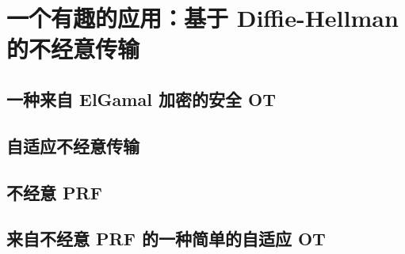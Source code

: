 \section{一个有趣的应用：基于 Diffie-Hellman 的不经意传输}

\subsection{一种来自 ElGamal 加密的安全 OT}

\subsection{自适应不经意传输}\label{subsec:11-7-2}

\subsection{不经意 PRF}\label{subsec:11-7-3}

\subsection{来自不经意 PRF 的一种简单的自适应 OT}